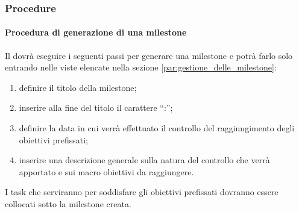 
			
		\subsubsection{Procedure}
			\paragraph{Procedura di generazione di una milestone} %
			\label{par:procedura_di_generazione_di_una_milestone}
			Il \roleProjectManager{} dovrà eseguire i seguenti passi per generare una milestone e potrà farlo solo entrando nelle viste elencate nella sezione \ref{par:gestione_delle_milestone}:
				\begin{enumerate}
					\item definire il titolo della milestone\gloss{};
					\item inserire alla fine del titolo il carattere ``:'';
					\item definire la data in cui verrà effettuato il controllo del raggiungimento degli obiettivi prefissati;
					\item inserire una descrizione generale sulla natura del controllo che verrà apportato e sui macro obiettivi da raggiungere.
				\end{enumerate}
			\noindent
			I task\gloss{} che serviranno per soddisfare gli obiettivi prefissati dovranno essere collocati sotto la milestone\gloss{} creata.
		
